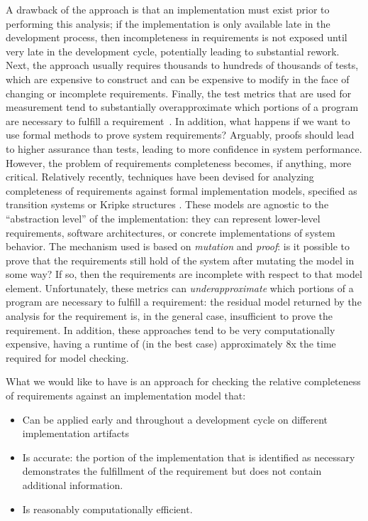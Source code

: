 A drawback of the approach is that an implementation must exist prior to performing this analysis; if the implementation is only available late in the development process, then incompleteness in requirements is not exposed until very late in the development cycle, potentially leading to substantial rework.  Next, the approach usually requires thousands to hundreds of thousands of tests, which are expensive to construct and can be expensive to modify in the face of changing or incomplete requirements.  Finally, the test metrics that are used for measurement tend to substantially overapproximate which portions of a program are necessary to fulfill a requirement~\cite{Whalen13:OMCDC, chelenski1994oapplicability}.
In addition, what happens if we want to use formal methods to prove system requirements?  Arguably, proofs should lead to higher assurance than tests, leading to more confidence in system performance.  However, the problem of requirements completeness becomes, if anything, more critical.  Relatively recently,
%
%
techniques have been devised for analyzing completeness of requirements against formal implementation models, specified as transition systems or Kripke structures \cite{das2005formal, claessen2007coverage, grosse2007estimating}.  These models are agnostic to the ``abstraction level'' of the implementation: they can represent lower-level requirements, software architectures, or concrete implementations of system behavior.  The mechanism used is based on {\em mutation} and {\em proof}: is it possible to prove that the requirements still hold of the system after mutating the model in some way?  If so, then the requirements are incomplete with respect to that model element.  Unfortunately, these metrics can {\em underapproximate} which portions of a program are necessary to fulfill a requirement: the residual model returned by the analysis for the requirement is, in the general case, insufficient to prove the requirement.  In addition, these approaches tend to be very computationally expensive, having a runtime of (in the best case) approximately 8x the time required for model checking.

What we would like to have is an approach for checking the relative completeness of requirements against an implementation model that:
\begin{itemize}
    \item Can be applied early and throughout a development cycle on different implementation artifacts
    \item Is accurate: the portion of the implementation that is identified as necessary demonstrates the
        fulfillment of the requirement but does not contain additional information.
    \item Is reasonably computationally efficient.
\end{itemize}

